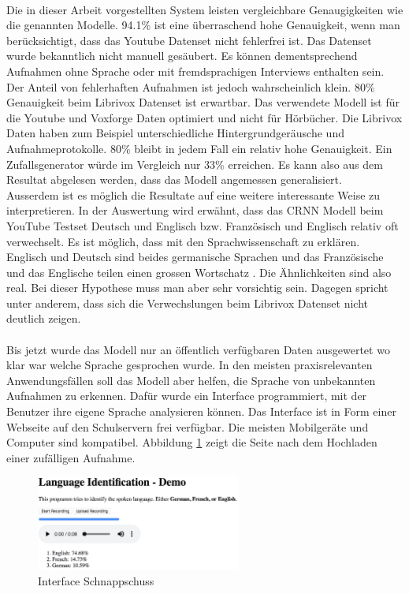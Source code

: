 \\
Die in dieser Arbeit vorgestellten System leisten vergleichbare Genaugigkeiten wie die genannten Modelle. 94.1\% ist eine überraschend hohe Genauigkeit, wenn man berücksichtigt, dass das Youtube Datenset nicht fehlerfrei ist. Das Datenset wurde bekanntlich nicht manuell gesäubert. Es können dementsprechend Aufnahmen ohne Sprache oder mit fremdsprachigen Interviews enthalten sein. Der Anteil von fehlerhaften Aufnahmen ist jedoch wahrscheinlich klein. 
80\% Genauigkeit beim Librivox Datenset ist erwartbar. Das verwendete Modell ist für die Youtube und Voxforge Daten optimiert und nicht für Hörbücher. Die Librivox Daten haben zum Beispiel unterschiedliche Hintergrundgeräusche und Aufnahmeprotokolle. 80\% bleibt in jedem Fall ein relativ hohe Genauigkeit. Ein Zufallsgenerator würde im Vergleich nur 33\% erreichen. Es kann also aus dem Resultat abgelesen werden, dass das Modell angemessen generalisiert. 
\\
Ausserdem ist es möglich die Resultate auf eine weitere interessante Weise zu interpretieren. In der Auswertung wird erwähnt, dass das CRNN Modell beim YouTube Testset Deutsch und Englisch bzw. Französisch und Englisch relativ oft verwechselt. Es ist möglich, dass mit den Sprachwissenschaft zu erklären. Englisch und Deutsch sind beides germanische Sprachen und das Französische und das Englische teilen einen grossen Wortschatz \parencite{germanic}\parencite{english}. Die Ähnlichkeiten sind also real. Bei dieser Hypothese muss man aber sehr vorsichtig sein. Dagegen spricht unter anderem, dass sich die Verwechslungen beim Librivox Datenset nicht deutlich zeigen.
\\ \\
Bis jetzt wurde das Modell nur an öffentlich verfügbaren Daten ausgewertet wo klar war welche Sprache gesprochen wurde. In den meisten praxisrelevanten Anwendungsfällen soll das Modell aber helfen, die Sprache von unbekannten Aufnahmen zu erkennen. Dafür wurde ein Interface programmiert, mit der Benutzer ihre eigene Sprache analysieren können. Das Interface ist in Form einer Webseite auf den Schulservern frei verfügbar. Die meisten Mobilgeräte und Computer sind kompatibel. Abbildung \ref{img:interface} zeigt die Seite nach dem Hochladen einer zufälligen Aufnahme.
\begin{figure}[hbt]
	\centering
		\includegraphics[width=0.6\textwidth]{assets/interface.png}
	\caption{Interface Schnappschuss}
	\label{img:interface}
\end{figure}
